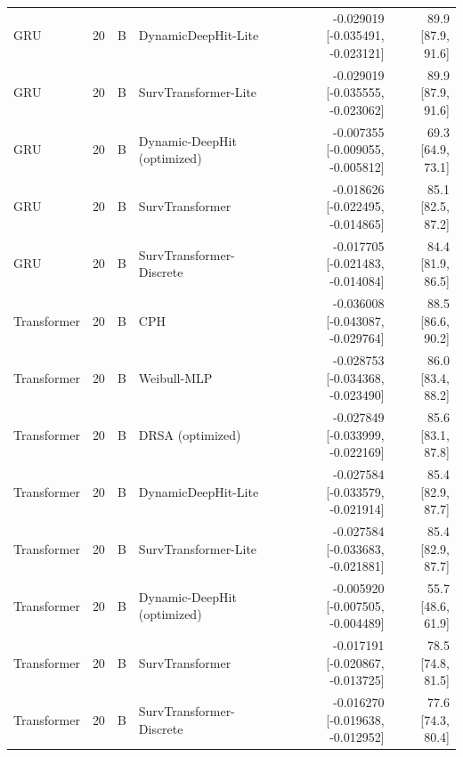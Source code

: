 \begin{longtable}{lll p{3.0cm} rr}
GRU & 20 & B & DynamicDeepHit-Lite & -0.029019 [-0.035491, -0.023121] & 89.9 [87.9, 91.6]\\
GRU & 20 & B & SurvTransformer-Lite & -0.029019 [-0.035555, -0.023062] & 89.9 [87.9, 91.6]\\
GRU & 20 & B & Dynamic-DeepHit (optimized) & -0.007355 [-0.009055, -0.005812] & 69.3 [64.9, 73.1]\\
GRU & 20 & B & SurvTransformer & -0.018626 [-0.022495, -0.014865] & 85.1 [82.5, 87.2]\\
GRU & 20 & B & SurvTransformer-Discrete & -0.017705 [-0.021483, -0.014084] & 84.4 [81.9, 86.5]\\
Transformer & 20 & B & CPH & -0.036008 [-0.043087, -0.029764] & 88.5 [86.6, 90.2]\\
Transformer & 20 & B & Weibull-MLP & -0.028753 [-0.034368, -0.023490] & 86.0 [83.4, 88.2]\\
Transformer & 20 & B & DRSA (optimized) & -0.027849 [-0.033999, -0.022169] & 85.6 [83.1, 87.8]\\
Transformer & 20 & B & DynamicDeepHit-Lite & -0.027584 [-0.033579, -0.021914] & 85.4 [82.9, 87.7]\\
Transformer & 20 & B & SurvTransformer-Lite & -0.027584 [-0.033683, -0.021881] & 85.4 [82.9, 87.7]\\
Transformer & 20 & B & Dynamic-DeepHit (optimized) & -0.005920 [-0.007505, -0.004489] & 55.7 [48.6, 61.9]\\
Transformer & 20 & B & SurvTransformer & -0.017191 [-0.020867, -0.013725] & 78.5 [74.8, 81.5]\\
Transformer & 20 & B & SurvTransformer-Discrete & -0.016270 [-0.019638, -0.012952] & 77.6 [74.3, 80.4]\\
\end{longtable}
\endgroup

